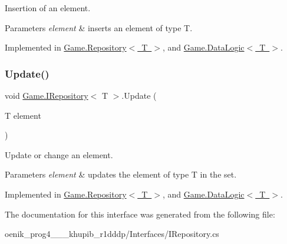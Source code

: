 Insertion of an element. 


\begin{DoxyParams}{Parameters}
{\em element} & inserts an element of type T.\\
\hline
\end{DoxyParams}


Implemented in \mbox{\hyperlink{class_game_1_1_repository_ae6382abbe87ee7fb27ff74103459b3ed}{Game.\+Repository$<$ T $>$}}, and \mbox{\hyperlink{class_game_1_1_data_logic_ad8b9080bf8b772b0df540668d3052c84}{Game.\+Data\+Logic$<$ T $>$}}.

\mbox{\label{interface_game_1_1_i_repository_a5482bc216e74fc42127e933df0e433c2}} 
\subsubsection{\texorpdfstring{Update()}{Update()}}
{\footnotesize\ttfamily void \mbox{\hyperlink{interface_game_1_1_i_repository}{Game.\+I\+Repository}}$<$ T $>$.Update (\begin{DoxyParamCaption}\item[{T}]{element }\end{DoxyParamCaption})}



Update or change an element. 


\begin{DoxyParams}{Parameters}
{\em element} & updates the element of type T in the set.\\
\hline
\end{DoxyParams}


Implemented in \mbox{\hyperlink{class_game_1_1_repository_a798084f6c10a2603f2be991ef872b072}{Game.\+Repository$<$ T $>$}}, and \mbox{\hyperlink{class_game_1_1_data_logic_a8264b0558379ab47f0c1715664781731}{Game.\+Data\+Logic$<$ T $>$}}.



The documentation for this interface was generated from the following file\+:\begin{DoxyCompactItemize}
\item 
oenik\+\_\+prog4\+\_\+\_\+\_\+khupib\+\_\+r1dddp/\+Interfaces/I\+Repository.\+cs\end{DoxyCompactItemize}
